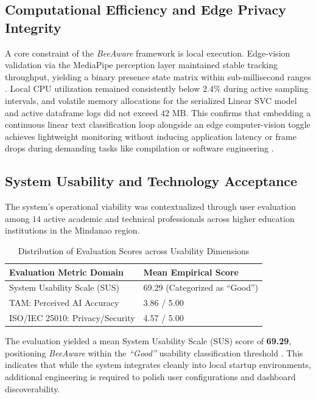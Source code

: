\documentclass[conference]{IEEEtran}
\begin{document}
\subsection{Computational Efficiency and Edge Privacy Integrity}
A core constraint of the \emph{BeeAware} framework is local execution. Edge-vision validation via the MediaPipe perception layer maintained stable tracking throughput, yielding a binary presence state matrix within sub-millisecond ranges \cite{Lugaresi2019, Bazarevsky2019}. Local CPU utilization remained consistently below $2.4\%$ during active sampling intervals, and volatile memory allocations for the serialized Linear SVC model and active dataframe logs did not exceed $42\text{ MB}$. This confirms that embedding a continuous linear text classification loop alongside an edge computer-vision toggle achieves lightweight monitoring without inducing application latency or frame drops during demanding tasks like compilation or software engineering \cite{Salice2024}.

\subsection{System Usability and Technology Acceptance}
The system's operational viability was contextualized through user evaluation among $14$ active academic and technical professionals across higher education institutions in the Mindanao region.

\begin{table}[htbp]
\caption{Distribution of Evaluation Scores across Usability Dimensions}
\label{tab:sus_tam_metrics}
\begin{center}
\begin{tabularx}{\linewidth}{lX}
\hline
\textbf{Evaluation Metric Domain} & \textbf{Mean Empirical Score} \\ \hline
System Usability Scale (SUS)      & 69.29 (Categorized as ``Good'') \\
TAM: Perceived AI Accuracy        & 3.86 / 5.00                   \\
ISO/IEC 25010: Privacy/Security   & 4.57 / 5.00                   \\ \hline
\end{tabularx}
\end{center}
\end{table}

The evaluation yielded a mean System Usability Scale (SUS) score of \textbf{69.29}, positioning \emph{BeeAware} within the \emph{``Good''} usability classification threshold \cite{Bangor2008}. This indicates that while the system integrates cleanly into local startup environments, additional engineering is required to polish user configurations and dashboard discoverability. 
\end{document}
